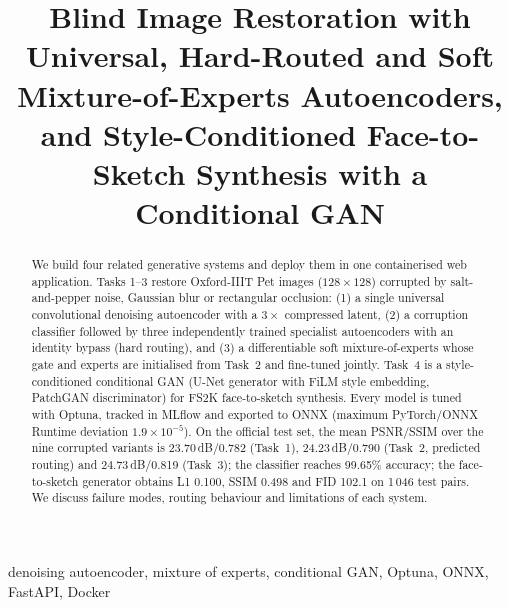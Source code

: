 \documentclass[conference]{IEEEtran}
\begin{document}
\title{Blind Image Restoration with Universal, Hard-Routed and Soft Mixture-of-Experts Autoencoders, and Style-Conditioned Face-to-Sketch Synthesis with a Conditional GAN}

\author{
}
\maketitle

\begin{abstract}
We build four related generative systems and deploy them in one containerised web application. Tasks 1--3 restore Oxford-IIIT Pet images ($128\times128$) corrupted by salt-and-pepper noise, Gaussian blur or rectangular occlusion: (1) a single universal convolutional denoising autoencoder with a $3\times$ compressed latent, (2) a corruption classifier followed by three independently trained specialist autoencoders with an identity bypass (hard routing), and (3) a differentiable soft mixture-of-experts whose gate and experts are initialised from Task~2 and fine-tuned jointly. Task~4 is a style-conditioned conditional GAN (U-Net generator with FiLM style embedding, PatchGAN discriminator) for FS2K face-to-sketch synthesis. Every model is tuned with Optuna, tracked in MLflow and exported to ONNX (maximum PyTorch/ONNX Runtime deviation $1.9\times10^{-5}$). On the official test set, the mean PSNR/SSIM over the nine corrupted variants is 23.70\,dB/0.782 (Task~1), 24.23\,dB/0.790 (Task~2, predicted routing) and 24.73\,dB/0.819 (Task~3); the classifier reaches 99.65\% accuracy; the face-to-sketch generator obtains L1 0.100, SSIM 0.498 and FID 102.1 on 1\,046 test pairs. We discuss failure modes, routing behaviour and limitations of each system.
\end{abstract}

\begin{IEEEkeywords}
denoising autoencoder, mixture of experts, conditional GAN, Optuna, ONNX, FastAPI, Docker
\end{IEEEkeywords}
\end{document}
